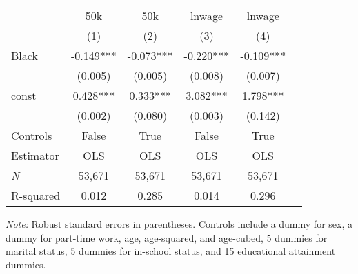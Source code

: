 \begin{tabular}{lccccc}
\toprule
 &        50k &        50k &     lnwage &     lnwage \\
\cline{2-5}
{} &        (1) &        (2) &        (3) &        (4) \\
\toprule
Black              &  -0.149*** &  -0.073*** &  -0.220*** &  -0.109*** \\
                   &    (0.005) &    (0.005) &    (0.008) &    (0.007) \\
const              &   0.428*** &   0.333*** &   3.082*** &   1.798*** \\
                   &    (0.002) &    (0.080) &    (0.003) &    (0.142) \\
Controls  &      False &       True &      False &       True \\
\midrule
Estimator          &        OLS &        OLS &        OLS &        OLS \\
\midrule
\textit{N}                  &     53,671 &     53,671 &     53,671 &     53,671 \\
R-squared          &      0.012 &      0.285 &      0.014 &      0.296 \\
\bottomrule
\end{tabular}

\noindent \textit{Note:} Robust standard errors in parentheses. Controls include a dummy for sex, a dummy for part-time work, age, age-squared, and age-cubed, 5 dummies for marital status, 5 dummies for in-school status, and 15 educational attainment dummies.